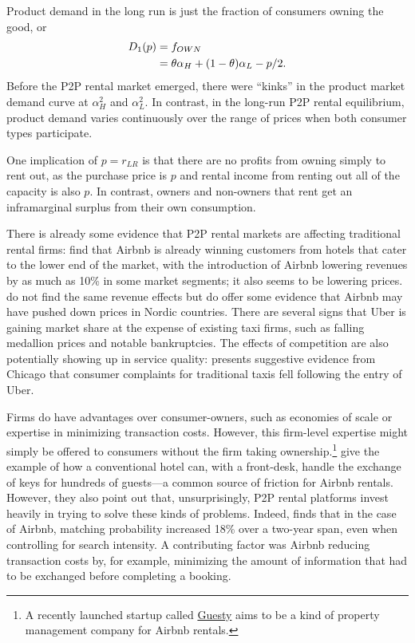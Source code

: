 \documentclass[11pt]{article}
\begin{document}
Product demand in the long run is just the fraction of consumers owning the good, or 
\begin{align}
D_1(p) &= f_{OWN} \notag \\  
     &= \theta \alpha_H + (1-\theta) \alpha_L - p/2.  
\end{align} 
Before the P2P rental market emerged, there were ``kinks'' in the product market demand curve at $\alpha_H^2$ and $\alpha_L^2$. 
In contrast, in the long-run P2P rental equilibrium, product demand varies continuously over the range of prices when both consumer types participate.

One implication of $p = r_{LR}$ is that there are no profits from owning simply to rent out, as the purchase price is $p$ and rental income from renting out all of the capacity is also $p$.  
In contrast, owners and non-owners that rent get an inframarginal surplus from their own consumption. 

There is already some evidence that P2P rental markets are affecting traditional rental firms: 
\cite{byers2013rise} find that Airbnb is already winning customers from hotels that cater to the lower end of the market, with the introduction of Airbnb lowering revenues by as much as 10\% in some market segments;
it also seems to be lowering prices. 
\cite{neeser2015does} do not find the same revenue effects but do offer some evidence that Airbnb may have pushed down prices in Nordic countries.
There are several signs that Uber is gaining market share at the expense of existing taxi firms, such as falling medallion prices and notable bankruptcies.
The effects of competition are also potentially showing up in service quality:
\cite{wallsten2015} presents suggestive evidence from Chicago that consumer complaints for traditional taxis fell following the entry of Uber. 

Firms do have advantages over consumer-owners, such as economies of scale or expertise in minimizing transaction costs. 
However, this firm-level expertise might simply be offered to consumers without the firm taking ownership.\footnote{
  A recently launched startup called \href{https://www.guesty.com/}{Guesty} aims to be a kind of property management company for Airbnb rentals.
}
\cite{edelman2015efficiencies} give the example of how a conventional hotel can, with a front-desk, handle the exchange of keys for hundreds of guests---a common source of friction for Airbnb rentals.
However, they also point out that, unsurprisingly, P2P rental platforms invest heavily in trying to solve these kinds of problems. 
Indeed, \cite{fradkin2012online} finds that in the case of Airbnb, matching probability increased 18\% over a two-year span, even when controlling for search intensity.
A contributing factor was Airbnb reducing transaction costs by, for example, minimizing the amount of information that had to be exchanged before completing a booking. 
\end{document}
